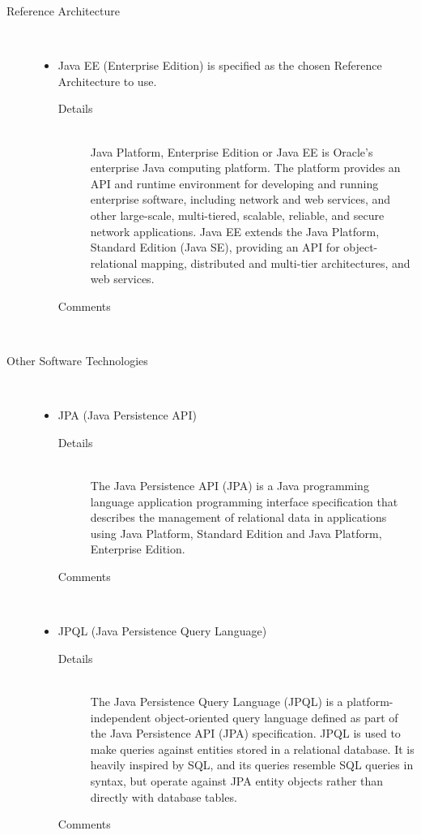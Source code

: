 \documentclass[10pt]{article}
\begin{document}
\begin{description}
		\item[Reference Architecture] \hfill \\
		 	 \begin{itemize}	
				\item Java EE (Enterprise Edition) is specified as the chosen Reference Architecture to use.
					\begin{description}
						\item[Details] \hfill \\
							Java Platform, Enterprise Edition or Java EE is Oracle's enterprise Java computing platform. The platform provides an
							 API and runtime environment for developing and running enterprise software, including network and web services, and
							 other large-scale, multi-tiered, scalable, reliable, and secure network applications. Java EE extends the Java Platform, 
							Standard Edition (Java SE),  providing an API for object-relational mapping, distributed and multi-tier architectures, and
							 web services. 
						\item[Comments]\hfill \\		
					\end{description}
			\end{itemize}
		\item[Other Software Technologies] \hfill \\
			\begin{itemize}
				\item JPA (Java Persistence API)
					\begin{description}
						\item[Details] \hfill \\
							The Java Persistence API (JPA) is a Java programming language application programming interface specification that
							 describes the management of relational data in applications using Java Platform, Standard Edition and Java Platform, Enterprise Edition.
						\item[Comments]\hfill \\
							
					\end{description}
				\item JPQL (Java Persistence Query Language)
					\begin{description}
						\item[Details] \hfill \\
							The Java Persistence Query Language (JPQL) is a platform-independent object-oriented query language defined as part
							 of the Java Persistence API (JPA) specification. JPQL is used to make queries against entities stored in a relational database.
							 It is heavily inspired by SQL, and its queries resemble SQL queries in syntax, but operate against JPA entity objects rather
							 than directly with database tables.
						\item[Comments]\hfill \\
							

\end{description}
\end{itemize}
\end{description}
\end{document}
